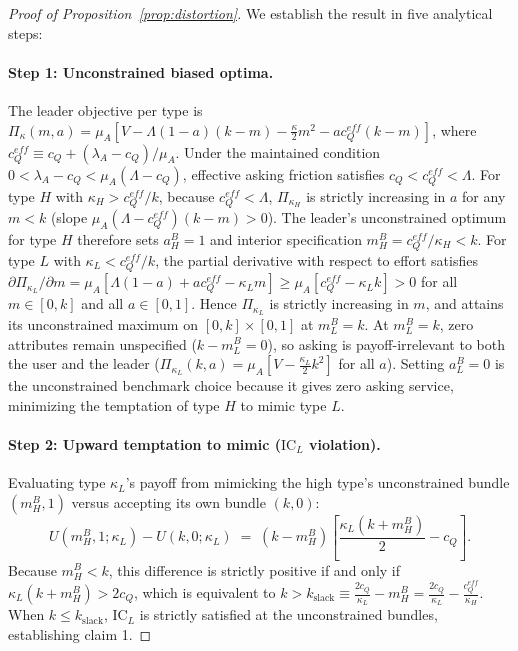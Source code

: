 \documentclass[11pt]{article}
\begin{document}
\begin{proof}[Proof of Proposition~\ref{prop:distortion}]
We establish the result in five analytical steps:

\paragraph{Step 1: Unconstrained biased optima.}
The leader objective per type is $\Pi_\kappa(m,a) = \mu_A [V - \Lambda(1-a)(k-m) - \frac{\kappa}{2}m^2 - a c_Q^{eff}(k-m)]$, where $c_Q^{eff} \equiv c_Q + (\lambda_A - c_Q)/\mu_A$. Under the maintained condition $0 < \lambda_A - c_Q < \mu_A(\Lambda - c_Q)$, effective asking friction satisfies $c_Q < c_Q^{eff} < \Lambda$.
For type $H$ with $\kappa_H > c_Q^{eff}/k$, because $c_Q^{eff} < \Lambda$, $\Pi_{\kappa_H}$ is strictly increasing in $a$ for any $m < k$ (slope $\mu_A(\Lambda - c_Q^{eff})(k-m) > 0$). The leader's unconstrained optimum for type $H$ therefore sets $a_H^B = 1$ and interior specification $m_H^B = c_Q^{eff}/\kappa_H < k$.
For type $L$ with $\kappa_L < c_Q^{eff}/k$, the partial derivative with respect to effort satisfies $\partial \Pi_{\kappa_L}/\partial m = \mu_A[\Lambda(1-a) + a c_Q^{eff} - \kappa_L m] \ge \mu_A[c_Q^{eff} - \kappa_L k] > 0$ for all $m \in [0, k]$ and all $a \in [0, 1]$. Hence $\Pi_{\kappa_L}$ is strictly increasing in $m$, and attains its unconstrained maximum on $[0, k] \times [0, 1]$ at $m_L^B = k$. At $m_L^B = k$, zero attributes remain unspecified ($k - m_L^B = 0$), so asking is payoff-irrelevant to both the user and the leader ($\Pi_{\kappa_L}(k, a) = \mu_A[V - \frac{\kappa_L}{2}k^2]$ for all $a$). Setting $a_L^B = 0$ is the unconstrained benchmark choice because it gives zero asking service, minimizing the temptation of type $H$ to mimic type $L$.

\paragraph{Step 2: Upward temptation to mimic ($\text{IC}_L$ violation).}
Evaluating type $\kappa_L$'s payoff from mimicking the high type's unconstrained bundle $(m_H^B, 1)$ versus accepting its own bundle $(k, 0)$:
\[
U(m_H^B, 1; \kappa_L) - U(k, 0; \kappa_L) \;=\; (k - m_H^B)\left[ \frac{\kappa_L(k + m_H^B)}{2} - c_Q \right].
\]
Because $m_H^B < k$, this difference is strictly positive if and only if $\kappa_L(k + m_H^B) > 2c_Q$, which is equivalent to $k > k_{\text{slack}} \equiv \frac{2 c_Q}{\kappa_L} - m_H^B = \frac{2 c_Q}{\kappa_L} - \frac{c_Q^{eff}}{\kappa_H}$. When $k \le k_{\text{slack}}$, $\text{IC}_L$ is strictly satisfied at the unconstrained bundles, establishing claim 1.


\end{proof}
\end{document}
